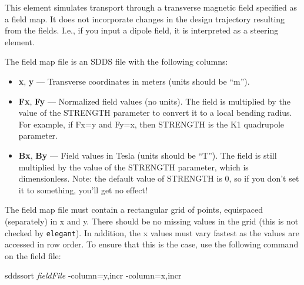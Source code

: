 This element simulates transport through a transverse magnetic field
specified as a field map.  It does not incorporate changes in the design
trajectory resulting from the fields.  I.e., if you input a dipole field,
it is interpreted as a steering element.

The field map file is an SDDS file with the following columns:
\begin{itemize}
\item {\bf x}, {\bf y} --- Transverse coordinates in meters (units should be ``m'').
\item {\bf Fx}, {\bf Fy} --- Normalized field values (no units).  The
        field is multiplied by the value of the STRENGTH parameter to convert it to a 
        local bending radius.  For example, if Fx=y and Fy=x, then STRENGTH is the
        K1 quadrupole parameter.
\item {\bf Bx}, {\bf By} --- Field values in Tesla (units should be ``T'').
        The field is still multiplied by the value of the STRENGTH parameter, which
        is dimensionless.  Note: the default value of STRENGTH is 0, so if you don't
        set it to something, you'll get no effect!
\end{itemize}

The field map file must contain a rectangular grid of points,
equispaced (separately) in x and y.  There should be no missing values
in the grid (this is not checked by {\tt elegant}).  In addition, the
x values must vary fastest as the values are accessed in row order.
To ensure that this is the case, use the following command on the field
file:
\begin{flushleft}
sddssort {\em fieldFile} -column=y,incr -column=x,incr
\end{flushleft}

